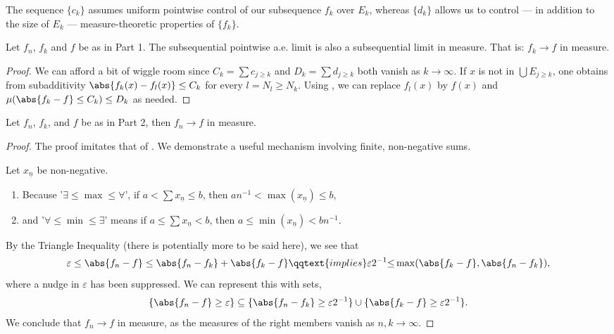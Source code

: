 \documentclass[../../main.tex]{subfiles}
\begin{document}
\begin{remark}
        The sequence $\{c_k\}$ assumes uniform pointwise control of our subsequence $f_k$ over $E_k$, whereas $\{d_k\}$ allows us to control --- in addition to the size of $E_k$ --- measure-theoretic properties of $\{f_k\}$.
    \end{remark}
\begin{wts}
    Let $f_n$, $f_k$ and $f$ be as in Part 1. The subsequential pointwise a.e. limit is also a subsequential limit in measure. That is: $f_k\to f$ in measure.
\end{wts}
\begin{proof}
    We can afford a bit of wiggle room since $C_k = \sum c_{j\geq k}$ and $D_k = \sum d_{j\geq k}$ both vanish as $k\to\infty$. If $x$ is not in $\bigcup E_{j\geq k}$, one obtains from subadditivity $\abs{f_k(x) - f_{l}(x)} \leq C_k$ for every $l = N_l\geq N_k$. Using , we can replace $f_l(x)$ by $f(x)$ and $\mu(\abs{f_k-f}\leq C_k)\leq D_k$ as needed.
\end{proof}
\begin{wts}
    Let $f_n$, $f_k$, and $f$ be as in Part 2, then $f_{n}\to f$ in measure.
\end{wts}
\begin{proof}
    The proof imitates that of . We demonstrate a useful mechanism involving finite, non-negative sums.
    \begin{note}
        Let $x_{\underline{n}}$ be non-negative.
        \begin{enumerate}
            \item Because '$\exists \leq \max \leq \forall$', if $a< \sum x_{\underline{n}} \leq b$, then 
        $
        an^{-1}< \max(x_{\underline{n}})\leq b
        $,
        \item and '$\forall \leq \min \leq \exists$' means if $a \leq \sum x_{\underline{n}}< b$, then 
        $
            a\leq \min(x_{\underline{n}})< bn^{-1}
        $.
        \end{enumerate}
    \end{note}
    By the Triangle Inequality (there is potentially more to be said here), we see that
    \[
        \varepsilon\leq \abs{f_n - f}\leq \abs{f_n - f_k} + \abs{f_k - f}\qqtext{implies}\varepsilon2^{-1}{\leq }\max(\abs{f_k - f}, \abs{f_n - f_k}),
    \]
    where a nudge in $\varepsilon$ has been suppressed. We can represent this with sets, 
    \begin{equation}\label{eq:theorem2.30 cauchy pointwise = pointwise}
        \{\abs{f_n - f}\geq \varepsilon\}\subseteq \{\abs{f_n - f_k}\geq \varepsilon2^{-1}\}\cup \{\abs{f_k - f}\geq \varepsilon2^{-1}\}.
    \end{equation}
    We conclude that $f_n\to f$ in measure, as the measures of the right members vanish as $n,k\to\infty$.
\end{proof}
\end{document}
